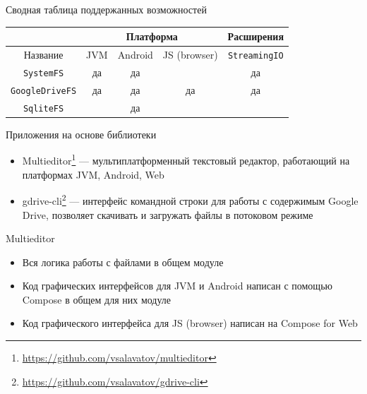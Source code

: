 \documentclass[14pt,aspectratio=169,hyperref={pdftex,unicode},xcolor=dvipsnames]{beamer}
\newcommand{\code}[1]{\mbox{\texttt{#1}}}
\begin{document}
\begin{frame}{Сводная таблица поддержанных возможностей}
\centering
\small
\begin{tabular}{|c|c|c|c|c|}
  \cline{2-5}
  \multicolumn{1}{c|}{} & \multicolumn{3}{c|}{Платформа} & Расширения \\
  \hline 
    Название & JVM & Android & JS (browser) & \code{StreamingIO} \\
  \hline 
    \code{SystemFS} & да & да &  & да \\
  \hline 
    \code{GoogleDriveFS} & да & да & да & да \\
  \hline 
    \code{SqliteFS} &  & да &  &  \\
  \hline
\end{tabular}      
\end{frame}

\begin{frame}{Приложения на основе библиотеки}
\begin{itemize}
  \item Multieditor\footnote{\url{https://github.com/vsalavatov/multieditor}} --- мультиплатформенный текстовый редактор, работающий на платформах JVM, Android, Web
  \item gdrive-cli\footnote{\url{https://github.com/vsalavatov/gdrive-cli}} --- интерфейс командной строки для работы с содержимым Google Drive, позволяет скачивать и загружать файлы в потоковом режиме
\end{itemize}
\end{frame}

\begin{frame}{Multieditor}
\begin{itemize}
  \item Вся логика работы с файлами в общем модуле
  \item Код графических интерфейсов для JVM и Android написан с помощью Compose в общем для них модуле
  \item Код графического интерфейса для JS (browser) написан на Compose for Web
\end{itemize}
\end{frame}
\end{document}
